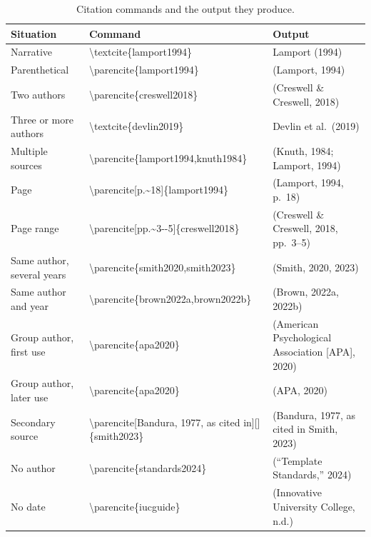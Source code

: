 \documentclass[11pt,a4paper]{article}
\newcommand\thd[1]{\bfseries #1}
\begin{document}
\begin{table}[htbp]
\caption{Citation commands and the output they produce.}
\label{tab:cite}
\small
\begin{tabularx}{\textwidth}{@{}>{\raggedright\arraybackslash}p{27mm}>{\ttfamily\raggedright\arraybackslash}p{66mm}>{\raggedright\arraybackslash}X@{}}
\toprule
\thd{Situation} & \normalfont\thd{Command} & \thd{Output} \\
\midrule
Narrative                    & \textbackslash textcite\{lamport1994\}            & Lamport (1994) \\
Parenthetical                & \textbackslash parencite\{lamport1994\}           & (Lamport, 1994) \\
Two authors                  & \textbackslash parencite\{creswell2018\}          & (Creswell \& Creswell, 2018) \\
Three or more authors        & \textbackslash textcite\{devlin2019\}             & Devlin et al.\ (2019) \\
Multiple sources             & \textbackslash parencite\{lamport1994,knuth1984\} & (Knuth, 1984; Lamport, 1994) \\
Page                         & \textbackslash parencite[p.\textasciitilde 18]\{lamport1994\} & (Lamport, 1994, p.~18) \\
Page range                   & \textbackslash parencite[pp.\textasciitilde 3-{}-5]\{creswell2018\} & (Creswell \& Creswell, 2018, pp.~3--5) \\
Same author, several years   & \textbackslash parencite\{smith2020,smith2023\}   & (Smith, 2020, 2023) \\
Same author and year         & \textbackslash parencite\{brown2022a,brown2022b\} & (Brown, 2022a, 2022b) \\
Group author, first use      & \textbackslash parencite\{apa2020\}               & (American Psychological Association [APA], 2020) \\
Group author, later use      & \textbackslash parencite\{apa2020\}               & (APA, 2020) \\
Secondary source             & \textbackslash parencite[Bandura, 1977, as cited in][]\{smith2023\} & (Bandura, 1977, as cited in Smith, 2023) \\
No author                    & \textbackslash parencite\{standards2024\}         & (``Template Standards,'' 2024) \\
No date                      & \textbackslash parencite\{iucguide\}              & (Innovative University College, n.d.) \\
\bottomrule
\end{tabularx}
\end{table}
\end{document}
